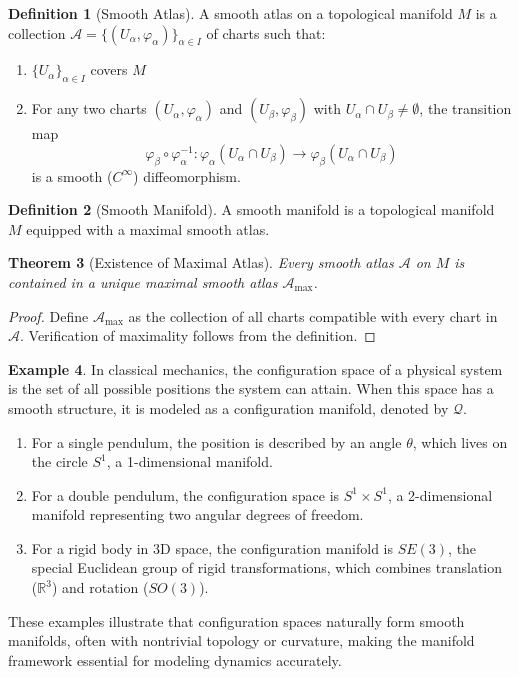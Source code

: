 \documentclass{article}
\theoremstyle{plain}
\newtheorem{theorem}{Theorem}[section]
\theoremstyle{definition}
\newtheorem{definition}[theorem]{Definition}
\newtheorem{example}[theorem]{Example}
\theoremstyle{remark}
\begin{document}
\begin{definition}[Smooth Atlas]
A smooth atlas on a topological manifold $M$ is a collection $\mathcal{A} = \{(U_\alpha, \varphi_\alpha)\}_{\alpha \in I}$ of charts such that:
\begin{enumerate}
\item $\{U_\alpha\}_{\alpha \in I}$ covers $M$
\item For any two charts $(U_\alpha, \varphi_\alpha)$ and $(U_\beta, \varphi_\beta)$ with $U_\alpha \cap U_\beta \neq \emptyset$, the transition map
\[\varphi_\beta \circ \varphi_\alpha^{-1}: \varphi_\alpha(U_\alpha \cap U_\beta) \to \varphi_\beta(U_\alpha \cap U_\beta)\]
is a smooth ($C^\infty$) diffeomorphism.
\end{enumerate}
\end{definition}

\begin{definition}[Smooth Manifold]
A smooth manifold is a topological manifold $M$ equipped with a maximal smooth atlas.
\end{definition}

\begin{theorem}[Existence of Maximal Atlas]
Every smooth atlas $\mathcal{A}$ on $M$ is contained in a unique maximal smooth atlas $\mathcal{A}_{\max}$.
\end{theorem}

\begin{proof}
Define $\mathcal{A}_{\max}$ as the collection of all charts compatible with every chart in $\mathcal{A}$. Verification of maximality follows from the definition.
\end{proof}


\begin{example}
In classical mechanics, the configuration space of a physical system is the set of all possible positions the system can attain. When this space has a smooth structure, it is modeled as a configuration manifold, denoted by $\mathcal{Q}$.

\begin{enumerate}
    \item For a single pendulum, the position is described by an angle $\theta$, which lives on the circle $S^1$, a 1-dimensional manifold.
    \item For a double pendulum, the configuration space is $S^1 \times S^1$, a 2-dimensional manifold representing two angular degrees of freedom.
    \item For a rigid body in 3D space, the configuration manifold is $SE(3)$, the special Euclidean group of rigid transformations, which combines translation ($\mathbb{R}^3$) and rotation ($SO(3)$).
\end{enumerate}
These examples illustrate that configuration spaces naturally form smooth manifolds, often with nontrivial topology or curvature, making the manifold framework essential for modeling dynamics accurately.
\end{example}
\end{document}
